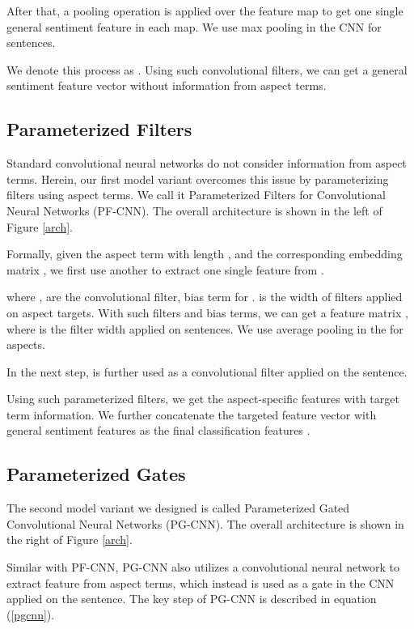 \documentclass[11pt,a4paper]{article}
\begin{document}
After that, a pooling operation is applied over the feature map to get one single general sentiment feature  in each map. We use max pooling in the CNN for sentences.

\vspace{-0.3cm}

We denote this process as .
Using  such convolutional filters, we can get a general sentiment feature vector  without information from aspect terms.

\subsection{Parameterized Filters}
Standard convolutional neural networks do not consider information from aspect terms. Herein, our first model variant overcomes this issue by parameterizing filters using aspect terms. We call it Parameterized Filters for Convolutional Neural Networks (PF-CNN). The overall architecture is shown in the left of Figure \ref{arch}.

Formally, given the aspect term with length ,  and the corresponding embedding matrix , we first use another  to extract one single feature  from .

where ,  are the convolutional filter, bias term for .  is the width of filters applied on aspect targets. With  such filters and bias terms, we can get a feature matrix , where  is the filter width applied on sentences. We use average pooling in the  for aspects.

In the next step,  is further used as a convolutional filter applied on the sentence.

Using such  parameterized filters, we get the aspect-specific features  with target term information. We further concatenate the targeted feature vector with general sentiment features as the final classification features .

\subsection{Parameterized Gates}
The second model variant we designed is called Parameterized Gated Convolutional Neural Networks (PG-CNN). The overall architecture is shown in the right of Figure \ref{arch}.

Similar with PF-CNN, PG-CNN also utilizes a convolutional neural network to extract feature  from aspect terms, which instead is used as a gate \cite{dauphin2016language} in the CNN applied on the sentence. The key step of PG-CNN is described in equation (\ref{pgcnn}). 
\end{document}

